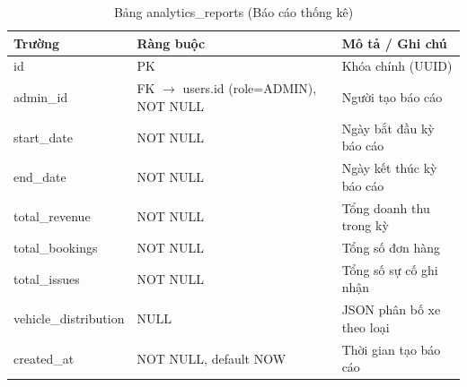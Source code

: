 \vspace{0.5cm}

\begin{longtable}{p{\colField} p{\colConst} p{\colDesc}}
    \caption{Bảng analytics\_reports (Báo cáo thống kê)} \label{tab:analytics} \\
    \toprule
    \textbf{Trường} & \textbf{Ràng buộc} & \textbf{Mô tả / Ghi chú} \\
    \midrule
    \endfirsthead
    \bottomrule
    \endlastfoot

    id & PK & Khóa chính (UUID) \\
    admin\_id & FK $\to$ users.id (role=ADMIN), NOT NULL & Người tạo báo cáo \\
    start\_date & NOT NULL & Ngày bắt đầu kỳ báo cáo \\
    end\_date & NOT NULL & Ngày kết thúc kỳ báo cáo \\
    total\_revenue & NOT NULL & Tổng doanh thu trong kỳ \\
    total\_bookings & NOT NULL & Tổng số đơn hàng \\
    total\_issues & NOT NULL & Tổng số sự cố ghi nhận \\
    vehicle\_distribution & NULL & JSON phân bố xe theo loại \\
    created\_at & NOT NULL, default NOW & Thời gian tạo báo cáo \\
\end{longtable}


